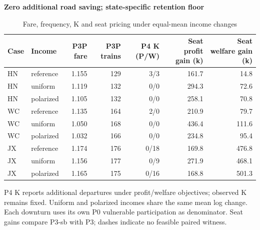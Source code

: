 \begin{table}[htbp]\centering
\caption{Fare, frequency, K and seat pricing under equal-mean income changes}\label{tab:round2_polarization}
\begin{minipage}{.95\textwidth}\fontsize{8}{10}\selectfont{}\setlength{\tabcolsep}{2pt}\renewcommand{\arraystretch}{1.08}
\par\noindent\textbf{Zero additional road saving; state-specific retention floor}\par\smallskip
\begin{tabular*}{\linewidth}{@{\extracolsep{\fill}}llrrrrr@{}}\toprule
Case & Income & P3P fare & P3P trains & P4 K (P/W) & Seat profit gain (k) & Seat welfare gain (k) \\
\midrule
HN & reference & 1.155 & 129 & 3/3 & 161.7 & 14.8 \\
HN & uniform & 1.119 & 132 & 0/0 & 294.3 & 72.6 \\
HN & polarized & 1.105 & 132 & 0/0 & 258.1 & 70.8 \\
WC & reference & 1.135 & 164 & 2/0 & 210.9 & 79.7 \\
WC & uniform & 1.050 & 168 & 0/0 & 436.4 & 111.6 \\
WC & polarized & 1.032 & 166 & 0/0 & 234.8 & 95.4 \\
JX & reference & 1.174 & 176 & 0/18 & 169.8 & 476.8 \\
JX & uniform & 1.156 & 177 & 0/9 & 271.9 & 468.1 \\
JX & polarized & 1.165 & 175 & 0/16 & 168.8 & 501.3 \\
\bottomrule\end{tabular*}\par\medskip
\par\noindent\fontsize{8}{9.5}\selectfont P4 K reports additional departures under profit/welfare objectives; observed K remains fixed. Uniform and polarized incomes share the same mean log change. Each downturn uses its own P0 vulnerable participation as denominator. Seat gains compare P3-sb with P3; dashes indicate no feasible paired witness.
\end{minipage}\end{table}
